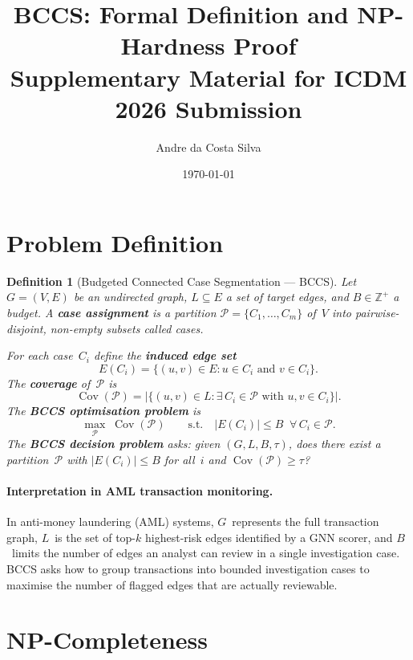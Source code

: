 \documentclass[11pt]{article}
\title{BCCS: Formal Definition and NP-Hardness Proof\\[6pt]
\large Supplementary Material for ICDM 2026 Submission}
\author{Andre da Costa Silva}
\date{\today}
\newtheorem{definition}{Definition}
\begin{document}
\maketitle

\section{Problem Definition}

\begin{definition}[Budgeted Connected Case Segmentation --- BCCS]
\label{def:bccs}
Let $G=(V,E)$ be an undirected graph, $L\subseteq E$ a set of
\emph{target edges}, and $B\in\mathbb{Z}^+$ a \emph{budget}.
A \textbf{case assignment} is a partition
$\mathcal{P}=\{C_1,\dots,C_m\}$ of~$V$ into pairwise-disjoint,
non-empty subsets called \emph{cases}.

For each case~$C_i$ define the \textbf{induced edge set}
\[
  E(C_i)=\bigl\{(u,v)\in E : u\in C_i \text{ and } v\in C_i\bigr\}.
\]
The \textbf{coverage} of~$\mathcal{P}$ is
\[
  \operatorname{Cov}(\mathcal{P})
  =\bigl|\{(u,v)\in L:\exists\, C_i\in\mathcal{P}
            \text{ with } u,v\in C_i\}\bigr|.
\]
The \textbf{BCCS optimisation problem} is
\[
  \max_{\mathcal{P}}\;\operatorname{Cov}(\mathcal{P})
  \qquad\text{s.t.}\quad |E(C_i)|\le B
  \;\;\forall\, C_i\in\mathcal{P}.
\]
The \textbf{BCCS decision problem} asks: given $(G,L,B,\tau)$, does
there exist a partition~$\mathcal{P}$ with
$|E(C_i)|\le B$ for all~$i$ and
$\operatorname{Cov}(\mathcal{P})\ge\tau$?
\end{definition}

\paragraph{Interpretation in AML transaction monitoring.}
In anti-money laundering (AML) systems, $G$~represents the full
transaction graph, $L$~is the set of top-$k$ highest-risk edges
identified by a GNN scorer, and $B$~limits the number of edges an
analyst can review in a single investigation case.  BCCS asks how to
group transactions into bounded investigation cases to maximise the
number of flagged edges that are actually reviewable.

\section{NP-Completeness}
\end{document}
